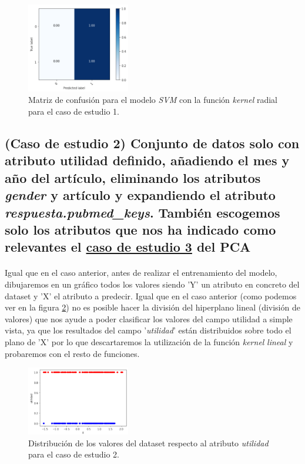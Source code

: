 {\begin{figure}[!htb]
  \centering
	\includegraphics[width=0.4\textwidth]{images/resultados_svm_cm_conjunto1.png}
	\caption{Matriz de confusión para el modelo \textit{SVM} con la función \textit{kernel} radial para el caso de estudio 1.}
  \label{svmCMCase1}
\end{figure}

\subsection{(Caso de estudio 2) Conjunto de datos solo con atributo utilidad definido, añadiendo el mes y año del artículo, eliminando los atributos \textit{gender} y artículo y expandiendo el atributo \textit{respuesta.pubmed\_keys}. También escogemos solo los atributos que nos ha indicado como relevantes el \hyperref[result:pca_case3]{caso de estudio 3} del PCA}

\paragraph{}
Igual que en el caso anterior, antes de realizar el entrenamiento del modelo, dibujaremos en un gráfico todos los valores siendo 'Y' un atributo en concreto del dataset y 'X' el atributo a predecir. Igual que en el caso anterior (como podemos ver en la figura \ref{svmDistributionCase2}) no es posible hacer la división del hiperplano lineal (división de valores) que nos ayude a poder clasificar los valores del campo utilidad a simple vista, ya que los resultados del campo '\textit{utilidad}' están distribuidos sobre todo el plano de 'X' por lo que descartaremos la utilización de la función \textit{kernel} \textit{lineal} y probaremos con el resto de funciones.

\begin{figure}[!htb]
  \centering
    \includegraphics[width=0.4\textwidth]{images/resultados_svm_distribucion_conjunto2.png}
    \caption{Distribución de los valores del dataset respecto al atributo \textit{utilidad} para el caso de estudio 2.}
  \label{svmDistributionCase2}
\end{figure}

}
